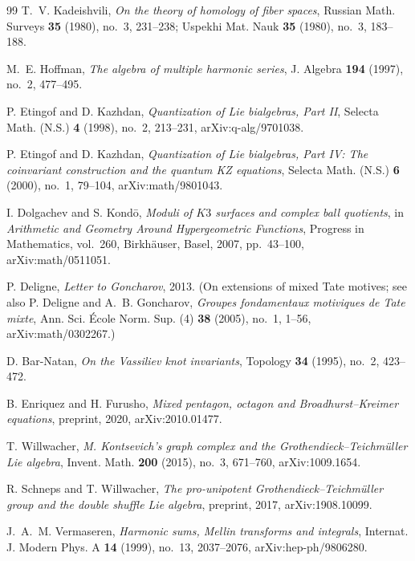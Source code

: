 \begin{thebibliography}{99}
T.~V. Kadeishvili, \emph{On the theory of homology of fiber spaces}, Russian Math. Surveys \textbf{35} (1980), no.~3, 231--238; Uspekhi Mat. Nauk \textbf{35} (1980), no.~3, 183--188.

M.~E. Hoffman, \emph{The algebra of multiple harmonic series}, J. Algebra \textbf{194} (1997), no.~2, 477--495.

P. Etingof and D. Kazhdan, \emph{Quantization of Lie bialgebras, Part II}, Selecta Math. (N.S.) \textbf{4} (1998), no.~2, 213--231, arXiv:q-alg/9701038.

P. Etingof and D. Kazhdan, \emph{Quantization of Lie bialgebras, Part IV: The coinvariant construction and the quantum KZ equations}, Selecta Math. (N.S.) \textbf{6} (2000), no.~1, 79--104, arXiv:math/9801043.

I. Dolgachev and S. Kond\=o, \emph{Moduli of $K3$ surfaces and complex ball quotients}, in \emph{Arithmetic and Geometry Around Hypergeometric Functions}, Progress in Mathematics, vol.~260, Birkh\"auser, Basel, 2007, pp.~43--100, arXiv:math/0511051.

P. Deligne, \emph{Letter to Goncharov}, 2013. (On extensions of mixed Tate motives; see also P. Deligne and A.~B. Goncharov, \emph{Groupes fondamentaux motiviques de Tate mixte}, Ann. Sci. \'Ecole Norm. Sup. (4) \textbf{38} (2005), no.~1, 1--56, arXiv:math/0302267.)

D. Bar-Natan, \emph{On the Vassiliev knot invariants}, Topology \textbf{34} (1995), no.~2, 423--472.

B. Enriquez and H. Furusho, \emph{Mixed pentagon, octagon and Broadhurst--Kreimer equations}, preprint, 2020, arXiv:2010.01477.

T. Willwacher, \emph{M. Kontsevich's graph complex and the Grothendieck--Teichm\"uller Lie algebra}, Invent. Math. \textbf{200} (2015), no.~3, 671--760, arXiv:1009.1654.

R. Schneps and T. Willwacher, \emph{The pro-unipotent Grothendieck--Teichm\"uller group and the double shuffle Lie algebra}, preprint, 2017, arXiv:1908.10099.

J.~A.~M. Vermaseren, \emph{Harmonic sums, Mellin transforms and integrals}, Internat. J. Modern Phys. A \textbf{14} (1999), no.~13, 2037--2076, arXiv:hep-ph/9806280.


\end{thebibliography}
